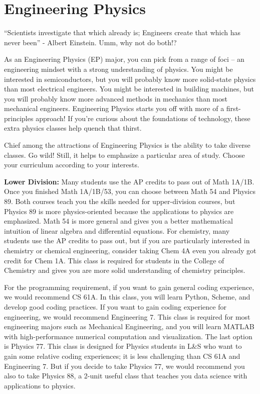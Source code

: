 \chapter*{Engineering Physics}

“Scientists investigate that which already is; Engineers create that which has never been” - Albert Einstein. Umm, why not do both!?
 
As an Engineering Physics (EP) major, you can pick from a range of foci – an engineering mindset with a strong understanding of physics. You might be interested in semiconductors, but you will probably know more solid-state physics than most electrical engineers. You might be interested in building machines, but you will probably know more advanced methods in mechanics than most mechanical engineers. Engineering Physics starts you off with more of a first-principles approach! If you’re curious about the foundations of technology, these extra physics classes help quench that thirst.
 
Chief among the attractions of Engineering Physics is the ability to take diverse classes. Go wild! Still, it helps to emphasize a particular area of study. Choose your curriculum according to your interests.
 
\textbf{Lower Division:} Many students use the AP credits to pass out of Math 1A/1B. Once you finished Math 1A/1B/53, you can choose between Math 54 and Physics 89. Both courses teach you the skills needed for upper-division courses, but Physics 89 is more physics-oriented because the applications to physics are emphasized. Math 54 is more general and gives you a better mathematical intuition of linear algebra and differential equations. For chemistry, many students use the AP credits to pass out, but if you are particularly interested in chemistry or chemical engineering, consider taking Chem 4A even you already got credit for Chem 1A. This class is required for students in the College of Chemistry and gives you are more solid understanding of chemistry principles.
 
For the programming requirement, if you want to gain general coding experience, we would recommend CS 61A. In this class, you will learn Python, Scheme, and develop good coding practices. If you want to gain coding experience for engineering, we would recommend Engineering 7. This class is required for most engineering majors such as Mechanical Engineering, and you will learn MATLAB with high-performance numerical computation and visualization. The last option is Physics 77. This class is designed for Physics students in L\&S who want to gain some relative coding experiences; it is less challenging than CS 61A and Engineering 7. But if you decide to take Physics 77, we would recommend you also to take Physics 88, a 2-unit useful class that teaches you data science with applications to physics.
 
